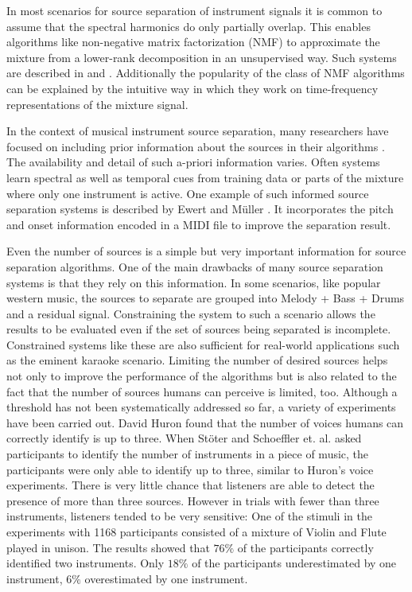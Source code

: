 In most scenarios for source separation of instrument signals it is common to assume that the spectral harmonics do only partially overlap. This enables algorithms like non-negative matrix factorization (NMF) to approximate the mixture from a lower-rank decomposition in an unsupervised way. Such systems are described in \cite{smaragdis03} and \cite{virtanen07}. Additionally the popularity of the class of NMF algorithms can be explained by the intuitive way in which they work on time-frequency representations of the mixture signal.

In the context of musical instrument source separation, many researchers have focused on including prior information about the sources in their algorithms \cite{ozerov12}. The availability and detail of such a-priori information varies. Often systems learn spectral as well as temporal cues from training data or parts of the mixture where only one instrument is active. One example of such informed source separation systems is described by Ewert and M\"uller \cite{ewert12}. It incorporates the pitch and onset information encoded in a MIDI file to improve the separation result.

Even the number of sources is a simple but very important information for source separation algorithms. One of the main drawbacks of many source separation systems is that they rely on this information. In some scenarios, like popular western music, the sources to separate are grouped into Melody + Bass + Drums and a residual signal. Constraining the system to such a scenario allows the results to be evaluated even if the set of sources being separated is incomplete. Constrained systems like these are also sufficient for real-world applications such as the eminent karaoke scenario. Limiting the number of desired sources helps not only to improve the performance of the algorithms but is also related to the fact that the number of sources humans can perceive is limited, too. Although a threshold has not been systematically addressed so far, a variety of experiments have been carried out. David Huron found \cite{huron89} that the number of voices humans can correctly identify is up to three. When St\"oter and Schoeffler et. al. \cite{stoeter13, schoeffler13} asked participants to identify the number of instruments in a piece of music, the participants were only able to identify up to three, similar to Huron's voice experiments. There is very little chance that listeners are able to detect the presence of more than three sources. However in trials with fewer than three instruments, listeners tended to be very sensitive: One of the stimuli in the \cite{stoeter13, schoeffler13} experiments with 1168 participants consisted of a mixture of Violin and Flute played in unison. The results showed that $76\%$ of the participants correctly identified two instruments. Only $18\%$ of the participants underestimated by one instrument, $6\%$ overestimated by one instrument.

